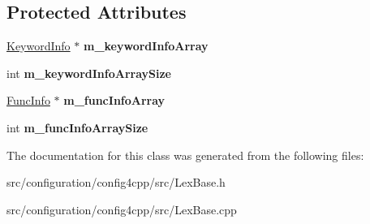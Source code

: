 \subsection*{Protected Attributes}
\begin{DoxyCompactItemize}
\item 
\hypertarget{classCONFIG4CPP__NAMESPACE_1_1LexBase_ae6266e0474783cb87ab2f111431591dd}{\hyperlink{structCONFIG4CPP__NAMESPACE_1_1LexBase_1_1KeywordInfo}{Keyword\-Info} $\ast$ {\bfseries m\-\_\-keyword\-Info\-Array}}\label{classCONFIG4CPP__NAMESPACE_1_1LexBase_ae6266e0474783cb87ab2f111431591dd}

\item 
\hypertarget{classCONFIG4CPP__NAMESPACE_1_1LexBase_a99c1cdbe1124a0c24c972d0c988b674e}{int {\bfseries m\-\_\-keyword\-Info\-Array\-Size}}\label{classCONFIG4CPP__NAMESPACE_1_1LexBase_a99c1cdbe1124a0c24c972d0c988b674e}

\item 
\hypertarget{classCONFIG4CPP__NAMESPACE_1_1LexBase_a4bce40b400287573c3ed00966ee63313}{\hyperlink{structCONFIG4CPP__NAMESPACE_1_1LexBase_1_1FuncInfo}{Func\-Info} $\ast$ {\bfseries m\-\_\-func\-Info\-Array}}\label{classCONFIG4CPP__NAMESPACE_1_1LexBase_a4bce40b400287573c3ed00966ee63313}

\item 
\hypertarget{classCONFIG4CPP__NAMESPACE_1_1LexBase_a167be1b93d17933ddeefa636f8b53af4}{int {\bfseries m\-\_\-func\-Info\-Array\-Size}}\label{classCONFIG4CPP__NAMESPACE_1_1LexBase_a167be1b93d17933ddeefa636f8b53af4}

\end{DoxyCompactItemize}


The documentation for this class was generated from the following files\-:\begin{DoxyCompactItemize}
\item 
src/configuration/config4cpp/src/Lex\-Base.\-h\item 
src/configuration/config4cpp/src/Lex\-Base.\-cpp\end{DoxyCompactItemize}
